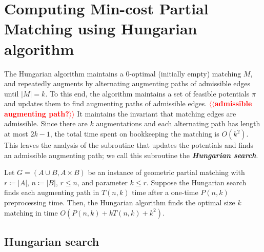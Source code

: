 \documentclass[a4paper,UKenglish]{socg-lipics-v2018}
\makeatletter
\def\note#1{\textcolor{red}{{#1}}}
\theoremstyle{plain}
\numberwithin{figure}{section}
\def\EMPH#1{\textbf{\emph{\boldmath #1}}}
\def\n@te#1{\textsf{\boldmath \textbf{$\langle\!\langle$#1$\rangle\!\rangle$}}\leavevmode}
\def\note#1{\textcolor{red}{\n@te{#1}}}
\makeatother
\begin{document}
\section{Computing Min-cost Partial Matching using Hungarian algorithm}
\label{section:hung}

The Hungarian algorithm maintains a 0-optimal (initially empty) matching $M$,
and repeatedly augments by alternating augmenting paths of admissible edges
until $|M| = k$.
To this end, the algorithm maintains a set of feasible potentials $\pi$ and
updates them to find augmenting paths of admissible edges. \note{admissible augmenting path?}
It maintains the invariant that matching edges are admissible.
Since there are $k$ augmentations and each alternating path has length at most
$2k-1$, the total time spent on bookkeeping the matching is $O(k^2)$.
This leaves the analysis of the subroutine that updates the potentials and
finds an admissible augmenting path; we call this subroutine the
\EMPH{Hungarian search}.



\begin{theorem}
\label{theorem:hung_orig}
Let $G = (A \cup B, A \times B)$ be an instance of geometric partial matching
with $r \coloneqq |A|$, $n \coloneqq |B|$, $r \leq n$, and parameter $k \leq r$.
Suppose the Hungarian search finds each augmenting path in $T(n, k)$ time after
a one-time $P(n, k)$ preprocessing time.
Then, the Hungarian algorithm finds the optimal size $k$ matching in time
$O(P(n, k) + k T(n, k) + k^2)$.
\end{theorem}

\subsection{Hungarian search}
\end{document}
